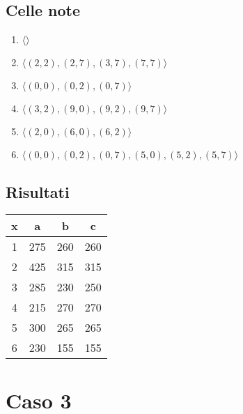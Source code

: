 \documentclass[11pt]{article}
\begin{document}
\subsection{Celle note}
\begin{enumerate}
    \item $\langle \rangle$
    \item $\langle (2, 2), (2, 7), (3, 7), (7, 7) \rangle$
    \item $\langle (0, 0), (0, 2), (0, 7) \rangle$
    \item $\langle (3, 2), (9, 0), (9, 2), (9, 7) \rangle$
    \item $\langle (2, 0), (6, 0), (6, 2) \rangle$
    \item $\langle (0, 0), (0, 2), (0, 7), (5, 0), (5, 2), (5, 7) \rangle$
\end{enumerate}

\subsection{Risultati}
\begin{table}[H]
    \begin{tabular}{|c|c|c|c|}
    \hline
    x & a & b & c \\ \hline \hline
    1 & 275 & 260 & 260 \\ \hline
    2 & 425 & 315 & 315 \\ \hline
    3 & 285 & 230 & 250 \\ \hline
    4 & 215 & 270 & 270 \\ \hline
    5 & 300 & 265 & 265 \\ \hline
    6 & 230 & 155 & 155 \\ \hline
    \end{tabular}
\end{table}

\section{Caso 3}
\end{document}
